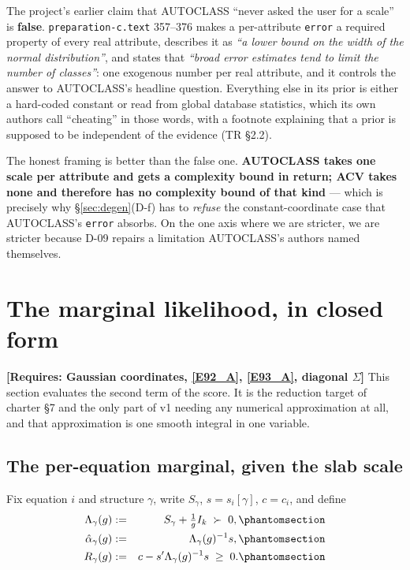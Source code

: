 \begin{remark}\label{rem:autoclass}
The project's earlier claim that AUTOCLASS ``never asked the user for a scale'' is
\textbf{false}. \texttt{preparation-c.text} 357--376 makes a per-attribute
\texttt{error} a required property of every real attribute, describes it as
\emph{``a lower bound on the width of the normal distribution''}, and states that
\emph{``broad error estimates tend to limit the number of classes''}: one exogenous
number per real attribute, and it controls the answer to AUTOCLASS's headline
question. Everything else in its prior is either a hard-coded constant or read from
global database statistics, which its own authors call ``cheating'' in those words,
with a footnote explaining that a prior is supposed to be independent of the evidence
(TR \S2.2).

The honest framing is better than the false one. \textbf{AUTOCLASS takes one scale
per attribute and gets a complexity bound in return; ACV takes none and therefore has
no complexity bound of that kind} --- which is precisely why \S\ref{sec:degen}(D-f)
has to \emph{refuse} the constant-coordinate case that AUTOCLASS's \texttt{error}
absorbs. On the one axis where we are stricter, we are stricter because D-09 repairs
a limitation AUTOCLASS's authors named themselves.
\end{remark}


\section{The marginal likelihood, in closed form}\label{sec:marginal}

\textbf{[Requires: Gaussian coordinates, \eqref{E92_A}, \eqref{E93_A}, diagonal
$\Sigma$]} This section evaluates the second term of the score. It is the reduction
target of charter \S7 and the only part of v1 needing any numerical approximation at
all, and that approximation is one smooth integral in one variable.

\subsection{The per-equation marginal, given the slab scale}

Fix equation $i$ and structure $\gamma$, write $S_\gamma$, $s=s_i[\gamma]$, $c=c_i$,
and define
\begin{eqnarray}
\Lambda_\gamma(g) &:=& S_\gamma + \tfrac1g I_k \;\succ\; 0,
  \Elabel{E-99A}{E99_A} \\
\hat\alpha_\gamma(g) &:=& \Lambda_\gamma(g)^{-1}s,
  \Elabel{E-99B}{E99_B} \\
R_\gamma(g) &:=& c - s'\Lambda_\gamma(g)^{-1}s \;\ge\; 0.
  \Elabel{E-100}{E100}
\end{eqnarray}


